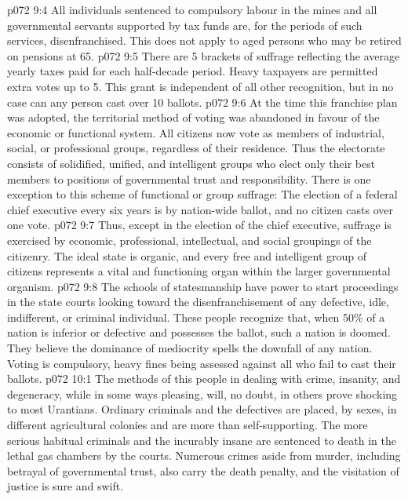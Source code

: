 \vs p072 9:4 \bibnobreakspace All individuals sentenced to compulsory labour in the mines and all governmental servants supported by tax funds are, for the periods of such services, disenfranchised. This does not apply to aged persons who may be retired on pensions at 65.
\vs p072 9:5 \bibnobreakspace There are 5 brackets of suffrage reflecting the average yearly taxes paid for each half\hyp{}decade period. Heavy taxpayers are permitted extra votes up to 5. This grant is independent of all other recognition, but in no case can any person cast over 10 ballots.
\vs p072 9:6 \bibnobreakspace At the time this franchise plan was adopted, the territorial method of voting was abandoned in favour of the economic or functional system. All citizens now vote as members of industrial, social, or professional groups, regardless of their residence. Thus the electorate consists of solidified, unified, and intelligent groups who elect only their best members to positions of governmental trust and responsibility. There is one exception to this scheme of functional or group suffrage: The election of a federal chief executive every six years is by nation\hyp{}wide ballot, and no citizen casts over one vote.
\vs p072 9:7 \pc Thus, except in the election of the chief executive, suffrage is exercised by economic, professional, intellectual, and social groupings of the citizenry. The ideal state is organic, and every free and intelligent group of citizens represents a vital and functioning organ within the larger governmental organism.
\vs p072 9:8 The schools of statesmanship have power to start proceedings in the state courts looking toward the disenfranchisement of any defective, idle, indifferent, or criminal individual. These people recognize that, when 50\% of a nation is inferior or defective and possesses the ballot, such a nation is doomed. They believe the dominance of mediocrity spells the downfall of any nation. Voting is compulsory, heavy fines being assessed against all who fail to cast their ballots.
\vs p072 10:1 The methods of this people in dealing with crime, insanity, and degeneracy, while in some ways pleasing, will, no doubt, in others prove shocking to most Urantians. Ordinary criminals and the defectives are placed, by sexes, in different agricultural colonies and are more than self\hyp{}supporting. The more serious habitual criminals and the incurably insane are sentenced to death in the lethal gas chambers by the courts. Numerous crimes aside from murder, including betrayal of governmental trust, also carry the death penalty, and the visitation of justice is sure and swift.
